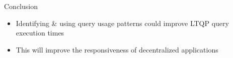 \begin{frame}{Conclusion}
    \begin{itemize}
        \item Identifying \& using query usage patterns could improve LTQP query execution times
        \item This will improve the responsiveness of decentralized applications
    \end{itemize}
\end{frame}